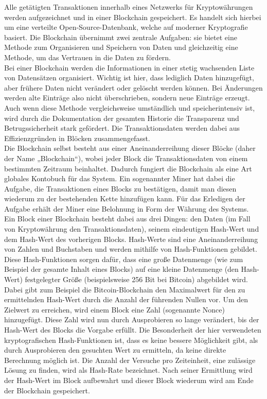 Alle getätigten Transaktionen innerhalb eines Netzwerks für Kryptowährungen werden aufgezeichnet und in einer Blockchain gespeichert. Es handelt sich hierbei um eine verteilte Open-Source-Datenbank, welche auf moderner Kryptografie basiert. Die Blockchain übernimmt zwei zentrale Aufgaben: sie bietet eine Methode zum Organisieren und Speichern von Daten und gleichzeitig eine Methode, um das Vertrauen in die Daten zu fördern.\\
Bei einer Blockchain werden die Informationen in einer stetig wachsenden Liste von Datensätzen organisiert. Wichtig ist hier, dass lediglich Daten hinzugefügt, aber frühere Daten nicht verändert oder gelöscht werden können. Bei Änderungen werden alte Einträge also nicht überschrieben, sondern neue Einträge erzeugt. Auch wenn diese Methode vergleichsweise umständlich und speicherintensiv ist, wird durch die Dokumentation der gesamten Historie die Transparenz und Betrugssicherheit stark gefördert. Die Transaktionsdaten werden dabei aus Effizienzgründen in Blöcken zusammengefasst.\\
Die Blockchain selbst besteht aus einer Aneinanderreihung dieser Blöcke (daher der Name „Blockchain“), wobei jeder Block die Transaktionsdaten von einem bestimmten Zeitraum beinhaltet. Dadurch fungiert die Blockchain als eine Art globales Kontobuch für das System. Ein sogenannter Miner hat dabei die Aufgabe, die Transaktionen eines Blocks zu bestätigen, damit man diesen wiederum zu der bestehenden Kette hinzufügen kann. Für das Erledigen der Aufgabe erhält der Miner eine Belohnung in Form der Währung des Systems.\\
Ein Block einer Blockchain besteht dabei aus drei Dingen: den Daten (im Fall von Kryptowährung den Transaktionsdaten), seinem eindeutigen Hash-Wert und dem Hash-Wert des vorherigen Blocks. Hash-Werte sind eine Aneinanderreihung von Zahlen und Buchstaben und werden mithilfe von Hash-Funktionen gebildet. Diese Hash-Funktionen sorgen dafür, dass eine große Datenmenge (wie zum Beispiel der gesamte Inhalt eines Blocks) auf eine kleine Datenmenge (den Hash-Wert) festgelegter Größe (beispielsweise 256 Bit bei Bitcoin) abgebildet wird. Dabei gibt zum Beispiel die Bitcoin-Blockchain den Maximalwert für den zu ermittelnden Hash-Wert durch die Anzahl der führenden Nullen vor. Um den Zielwert zu erreichen, wird einem Block eine Zahl (sogenannte Nonce) hinzugefügt. Diese Zahl wird nun durch Ausprobieren so lange verändert, bis der Hash-Wert des Blocks die Vorgabe erfüllt. Die Besonderheit der hier verwendeten kryptografischen Hash-Funktionen ist, dass es keine bessere Möglichkeit gibt, als durch Ausprobieren den gesuchten Wert zu ermitteln, da keine direkte Berechnung möglich ist. Die Anzahl der Versuche pro Zeiteinheit, eine zulässige Lösung zu finden, wird als Hash-Rate bezeichnet. Nach seiner Ermittlung wird der Hash-Wert im Block aufbewahrt und dieser Block wiederum wird am Ende der Blockchain gespeichert.\\
